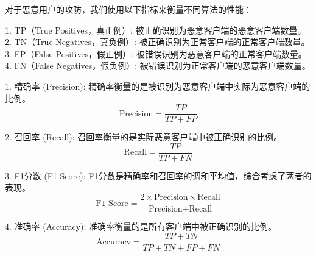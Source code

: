 \documentclass[conference]{IEEEtran}
\begin{document}
对于恶意用户的攻防，我们使用以下指标来衡量不同算法的性能：

1. TP（True Positives，真正例）: 被正确识别为恶意客户端的恶意客户端数量。
2. TN（True Negatives，真负例）: 被正确识别为正常客户端的正常客户端数量。
3. FP（False Positives，假正例）: 被错误识别为恶意客户端的正常客户端数量。
4. FN（False Negatives，假负例）: 被错误识别为正常客户端的恶意客户端数量。

1. 精确率 (Precision): 精确率衡量的是被识别为恶意客户端中实际为恶意客户端的比例。
    \[
    \text{Precision} = \frac{TP}{TP + FP}
    \]

2. 召回率 (Recall): 召回率衡量的是实际恶意客户端中被正确识别的比例。
    \[
    \text{Recall} = \frac{TP}{TP + FN}
    \]

3. F1分数 (F1 Score): F1分数是精确率和召回率的调和平均值，综合考虑了两者的表现。
    \[
    \text{F1 Score} = \frac{2 \times \text{Precision} \times \text{Recall}}{\text{Precision} + \text{Recall}}
    \]



4. 准确率 (Accuracy): 准确率衡量的是所有客户端中被正确识别的比例。
    \[
    \text{Accuracy} = \frac{TP + TN}{TP + TN + FP + FN}
    \]




\end{document}
